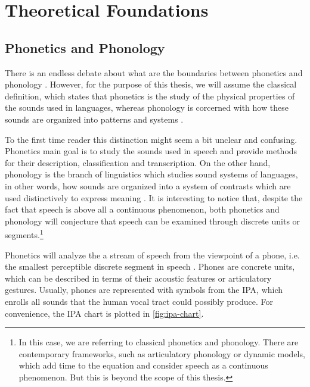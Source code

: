 \chapter{Theoretical Foundations}\label{ch:foundations}

\section{Phonetics and Phonology}\label{sec:phonetics-phonology}

There is an endless debate about what are the boundaries between phonetics and phonology \cite{Steriade2000}. However, for the purpose of this thesis, we will assume the classical definition, which states that phonetics is the study of the physical properties of the sounds used in languages, whereas phonology is corcerned with how these sounds are organized into patterns and systems \cite{Davenport2010}.

To the first time reader this distinction might seem a bit unclear and confusing. Phonetics main goal is to study the sounds used in speech and provide methods for their description, classification and transcription. On the other hand, phonology is the branch of linguistics which studies sound systems of languages, in other words, how sounds are organized into a system of contrasts which are used distinctively to express meaning \cite{Crystal2011}. It is interesting to notice that, despite the fact that speech is above all a continuous phenomenon, both phonetics and phonology will conjecture that speech can be examined through discrete units or segments.\footnote{In this case, we are referring to classical phonetics and phonology. There are contemporary frameworks, such as articulatory phonology or dynamic models, which add time to the equation and consider speech as a continuous phenomenon. But this is beyond the scope of this thesis.}

Phonetics will analyze the a stream of speech from the viewpoint of a phone, i.e. the smallest perceptible discrete segment in speech \cite{Crystal2011}. Phones are concrete units, which can be described in terms of their acoustic features or articulatory gestures. Usually, phones are represented with symbols from the \ac{IPA}, which enrolls all sounds that the human vocal tract could possibly produce. For convenience, the \ac{IPA} chart is plotted in \autoref{fig:ipa-chart}.

